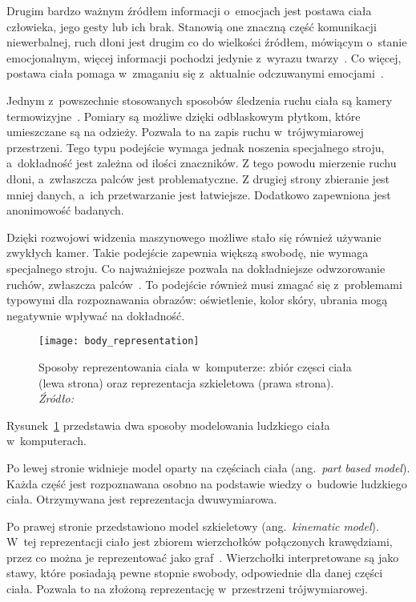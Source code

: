 Drugim bardzo ważnym źródłem informacji o~emocjach jest postawa ciała człowieka, jego gesty lub ich brak.
Stanowią one znaczną część komunikacji niewerbalnej, ruch dłoni jest drugim co do wielkości źródłem, mówiącym o~stanie emocjonalnym, więcej informacji pochodzi jedynie z~wyrazu twarzy~\cite{Noroozi2021}.
Co więcej, postawa ciała pomaga w~zmaganiu się z~aktualnie odczuwanymi emocjami~\cite{Kleinsmith2013}.

Jednym z~powszechnie stosowanych sposobów śledzenia ruchu ciała są kamery termowizyjne~\cite{Calvo2015}.
Pomiary są możliwe dzięki odblaskowym płytkom, które umieszczane są na odzieży.
Pozwala to na zapis ruchu w~trójwymiarowej przestrzeni.
Tego typu podejście wymaga jednak noszenia specjalnego stroju, a~dokładność jest zależna od ilości znaczników.
Z tego powodu mierzenie ruchu dłoni, a~zwłaszcza palców jest problematyczne.
Z drugiej strony zbieranie jest mniej danych, a~ich przetwarzanie jest łatwiejsze.
Dodatkowo zapewniona jest anonimowość badanych.

Dzięki rozwojowi widzenia maszynowego możliwe stało się również używanie zwykłych kamer.
Takie podejście zapewnia większą swobodę, nie wymaga specjalnego stroju.
Co najważniejsze pozwala na dokładniejsze odwzorowanie ruchów, zwłaszcza palców~\cite{Calvo2015}.
To podejście również musi zmagać się z~problemami typowymi dla rozpoznawania obrazów: oświetlenie, kolor skóry, ubrania mogą negatywnie wpływać na dokładność.

\begin{figure}[h]
    \centering
    \texttt{[image: body\_representation]}
    \caption{Sposoby reprezentowania ciała w~komputerze: zbiór częsci ciała (lewa strona) oraz reprezentacja szkieletowa (prawa strona). \textit{Źródło:~\cite{Noroozi2021}}}
    \label{fig:body-representation}
\end{figure}

Rysunek~\ref{fig:body-representation} przedstawia dwa sposoby modelowania ludzkiego ciała w~komputerach.

Po lewej stronie widnieje model oparty na częściach ciała (ang.~\textit{part based model}).
Każda część jest rozpoznawana osobno na podstawie wiedzy o~budowie ludzkiego ciała.
Otrzymywana jest reprezentacja dwuwymiarowa.

Po prawej stronie przedstawiono model szkieletowy (ang.~\textit{kinematic model}).
W~tej reprezentacji ciało jest zbiorem wierzchołków połączonych krawędziami, przez co można je reprezentować jako graf~\cite{Noroozi2021}.
Wierzchołki interpretowane są jako stawy, które posiadają pewne stopnie swobody, odpowiednie dla danej części ciała.
Pozwala to na złożoną reprezentację w~przestrzeni trójwymiarowej.

